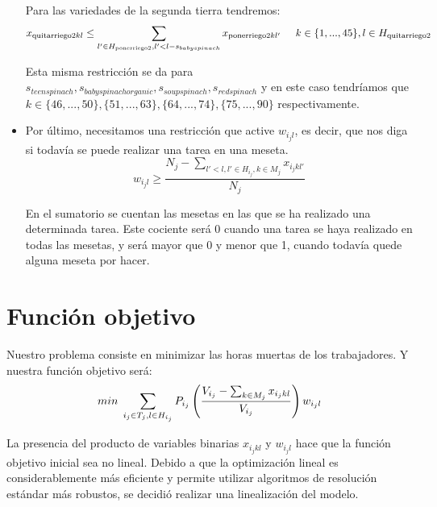 \begin{itemize}
        Para las variedades de la segunda tierra tendremos:
        \[
	        x_{\text{quitarriego}2 kl} \leq \sum_{l'\in H_{\text{ponerriego}2}, l'<l-s_{babyspinach}}x_{\text{ponerriego}2kl'} \hspace{0.5cm} k\in \{1, ..., 45\}, l\in H_{\text{quitarriego}2}
        \]

        Esta misma restricción se da para $s_{teenspinach}, s_{babyspinachorganic}, s_{soupspinach}, s_{redspinach}$ y en este caso tendríamos que $k \in \{46, ..., 50\},\{51, ..., 63\},\{64, ..., 74\},\{75, ..., 90\}$
        respectivamente.

    \item  Por último, necesitamos una restricción que active $w_{i_j l}$, es decir, que nos diga si todavía se puede realizar una tarea en una meseta. 
        \[
	        \displaystyle w_{i_j l}\geq \frac{N_j-\sum_{l'<l, l'\in H_{i_j}, k\in M_j}x_{i_j kl'}}{N_j}
        \]
	
	    En el sumatorio se cuentan las mesetas en las que se ha realizado una determinada tarea. Este cociente será $0$ cuando una tarea se haya realizado en todas las mesetas, y será mayor que 0 y menor que 1, cuando todavía quede alguna meseta por hacer. 
	
\end{itemize}


\section*{Función objetivo}
Nuestro problema consiste en minimizar las horas muertas de los trabajadores. Y nuestra función objetivo será: 
	\[
	    min\hspace{0.1cm} \sum_{i_j \in T_j, l\in H_{i_j}}P_{i_j}\left(\frac{V_{i_j}-\sum_{k\in M_j}x_{i_j kl}}{V_{i_j}}\right)w_{i_j l}
    \]

    La presencia del producto de variables binarias $x_{i_j kl}$ y  $w_{i_j l}$ hace que la función objetivo inicial sea no lineal.
    Debido a que la optimización lineal es considerablemente más eficiente y permite utilizar algoritmos de resolución estándar más robustos,
    se decidió realizar una linealización del modelo.

